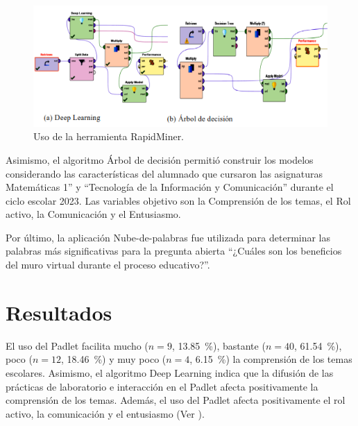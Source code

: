 \documentclass[spanish]{textolivre}
\begin{document}
\begin{figure}[h]
\centering
\begin{minipage}{.85\textwidth}
    \includegraphics[width=\linewidth]{Fig2.png}
    \caption{Uso de la herramienta RapidMiner.}
    \label{fig2}
\end{minipage}
\end{figure}

Asimismo, el algoritmo Árbol de decisión permitió construir los modelos considerando las características del alumnado que cursaron las asignaturas Matemáticas 1” y “Tecnología de la Información y Comunicación” durante el ciclo escolar 2023. Las variables objetivo son la Comprensión de los temas, el Rol activo, la Comunicación y el Entusiasmo.

Por último, la aplicación Nube-de-palabras fue utilizada para determinar las palabras más significativas para la pregunta abierta “¿Cuáles son los beneficios del muro virtual durante el proceso educativo?”.

\section{Resultados}\label{sec-organizacao-latex}
El uso del Padlet facilita mucho ($n = 9$, 13.85~\%), bastante ($n = 40$, 61.54~\%), poco ($n = 12$, 18.46~\%) y muy poco ($n = 4$, 6.15~\%) la comprensión de los temas escolares. Asimismo, el algoritmo Deep Learning indica que la difusión de las prácticas de laboratorio e interacción en el Padlet afecta positivamente la comprensión de los temas. Además, el uso del Padlet afecta positivamente el rol activo, la comunicación y el entusiasmo (Ver ).
\end{document}
